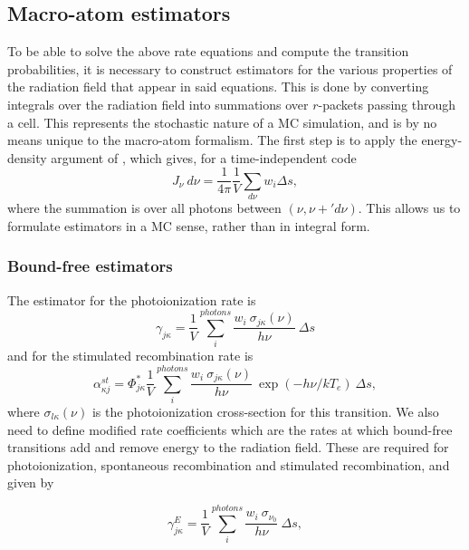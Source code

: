 \subsection{Macro-atom estimators}
\label{sec:estimators}
To be able to solve the above rate equations and compute the transition 
probabilities, it is necessary to construct estimators for the various properties
of the radiation field that appear in said equations. This is done
by converting integrals over the radiation field into summations over 
$r$-packets passing through a cell. This represents the stochastic nature of
a MC simulation, and is by no means unique to the macro-atom formalism.
The first step is to apply the energy-density argument of \cite{lucy1999radeq},
which gives, for a time-independent code
\begin{equation}
J_\nu~d\nu = \frac{1}{4\pi}\frac{1}{V} \sum_{d\nu} w_i \Delta s,
\end{equation}
where the summation is over all photons between $(\nu, \nu+'d\nu)$. This allows
us to formulate estimators in a MC sense, rather than in integral form. 

\subsubsection{Bound-free estimators}
The estimator for the photoionization rate is 
\begin{equation}
\gamma_{j\kappa} = \frac{1}{V} \sum_i^{photons} 
\frac{w_i~\sigma_{j\kappa}({\nu})}{h \nu}~\Delta s
\end{equation}
and for the stimulated recombination rate is
\begin{equation}
\alpha_{\kappa j}^{st} = \Phi^*_{j\kappa}
\frac{1}{V} \sum_i^{photons} 
\frac{w_i~\sigma_{j\kappa}({\nu})}{h \nu}
~\exp(-h\nu/kT_e)~\Delta s,
\end{equation}
where $\sigma_{l\kappa} (\nu)$ is the photoionization cross-section for this transition.
We also need to define modified rate coefficients which 
are the rates at which bound-free transitions add and remove energy to the radiation field.
These are required for photoionization, spontaneous recombination and stimulated
recombination, and given by

\begin{equation}
\gamma^E_{j\kappa} = \frac{1}{V} \sum_i^{photons} \frac{w_i~\sigma_{\nu_0}}{h \nu}~\Delta s, 
\end{equation}

